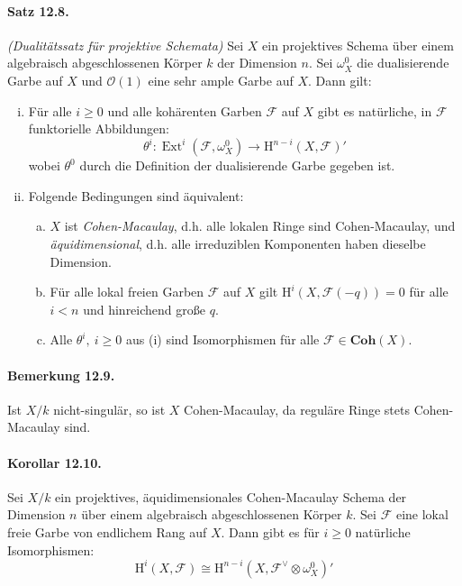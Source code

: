 \paragraph{Satz 12.8.}\label{12.8} \textit{(Dualitätssatz für projektive Schemata)} Sei $X$ ein projektives Schema über einem algebraisch abgeschlossenen Körper $k$ der Dimension $n$. Sei $\omega_X^0$ die dualisierende Garbe auf $X$ und $\mathcal{O}(1)$ eine sehr ample Garbe auf $X$. Dann gilt:
\begin{enumerate}[(i)]
\item Für alle $i\geq 0$ und alle kohärenten Garben $\mathcal{F}$ auf $X$ gibt es natürliche, in $\mathcal{F}$ funktorielle Abbildungen:
\[\theta^i:\operatorname{Ext}^i(\mathcal{F},\omega_X^0)\to\mathrm{H}^{n-i}(X,\mathcal{F})' \]
wobei $\theta^0$ durch die Definition der dualisierende Garbe gegeben ist.
\item Folgende Bedingungen sind äquivalent:
\begin{enumerate}[(a)]
\item $X$ ist \textit{Cohen-Macaulay}, d.h. alle lokalen Ringe sind Cohen-Macaulay, und \textit{äquidimensional}, d.h. alle irreduziblen Komponenten haben dieselbe Dimension.
\item Für alle lokal freien Garben $\mathcal{F}$ auf $X$ gilt $\mathrm{H}^i(X,\mathcal{F}(-q))=0$ für alle $i<n$ und hinreichend große $q$.
\item Alle $\theta^i,\ i\geq 0$ aus (i) sind Isomorphismen für alle $\mathcal{F}\in\mathbf{Coh}(X)$.
\end{enumerate}
\end{enumerate}

\paragraph{Bemerkung 12.9.}\label{12.9} Ist $X/k$ nicht-singulär, so ist $X$ Cohen-Macaulay, da reguläre Ringe stets Cohen-Macaulay sind.

\paragraph{Korollar 12.10.}\label{12.10} Sei $X/k$ ein projektives, äquidimensionales Cohen-Macaulay Schema der Dimension $n$ über einem algebraisch abgeschlossenen Körper $k$. Sei $\mathcal{F}$ eine lokal freie Garbe von endlichem Rang auf $X$. Dann gibt es für $i\geq 0$ natürliche Isomorphismen:
\[\mathrm{H}^i(X,\mathcal{F})\cong\mathrm{H}^{n-i}(X,\mathcal{F}^\vee\otimes\omega_X^0)' \]

